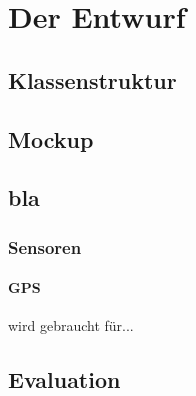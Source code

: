 \chapter{Der Entwurf}
\section{Klassenstruktur}
\section{Mockup}
\section{bla}
\subsection{Sensoren}
\subsubsection{GPS} wird gebraucht für...
\section{Evaluation}
